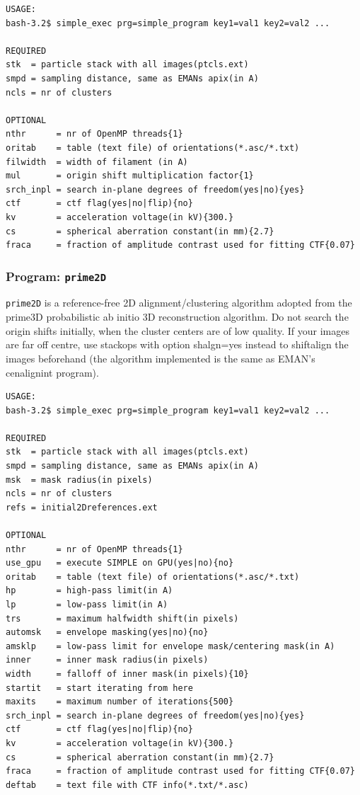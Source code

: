\documentclass[a4paper,11pt]{article}
\newcommand{\prgname}[1]{\textcolor{NavyBlue}{\texttt{#1}}}
\begin{document}
\begin{verbatim}
USAGE:
bash-3.2$ simple_exec prg=simple_program key1=val1 key2=val2 ...

REQUIRED
stk  = particle stack with all images(ptcls.ext)
smpd = sampling distance, same as EMANs apix(in A)
ncls = nr of clusters

OPTIONAL
nthr      = nr of OpenMP threads{1}
oritab    = table (text file) of orientations(*.asc/*.txt)
filwidth  = width of filament (in A)
mul       = origin shift multiplication factor{1}
srch_inpl = search in-plane degrees of freedom(yes|no){yes}
ctf       = ctf flag(yes|no|flip){no}
kv        = acceleration voltage(in kV){300.}
cs        = spherical aberration constant(in mm){2.7}
fraca     = fraction of amplitude contrast used for fitting CTF{0.07}
\end{verbatim}

\subsubsection{Program: \prgname{prime2D}}
\label{prime2D}
\prgname{prime2D} is a reference-free 2D alignment/clustering algorithm adopted from the prime3D probabilistic ab initio 3D reconstruction algorithm. Do not search the origin shifts initially, when the cluster centers are of low quality. If your images are far off centre, use stackops with option shalgn=yes instead to shiftalign the images beforehand (the algorithm implemented is the same as EMAN's cenalignint program).

\begin{verbatim}
USAGE:
bash-3.2$ simple_exec prg=simple_program key1=val1 key2=val2 ...

REQUIRED
stk  = particle stack with all images(ptcls.ext)
smpd = sampling distance, same as EMANs apix(in A)
msk  = mask radius(in pixels)
ncls = nr of clusters
refs = initial2Dreferences.ext

OPTIONAL
nthr      = nr of OpenMP threads{1}
use_gpu   = execute SIMPLE on GPU(yes|no){no}
oritab    = table (text file) of orientations(*.asc/*.txt)
hp        = high-pass limit(in A)
lp        = low-pass limit(in A)
trs       = maximum halfwidth shift(in pixels)
automsk   = envelope masking(yes|no){no}
amsklp    = low-pass limit for envelope mask/centering mask(in A)
inner     = inner mask radius(in pixels)
width     = falloff of inner mask(in pixels){10}
startit   = start iterating from here
maxits    = maximum number of iterations{500}
srch_inpl = search in-plane degrees of freedom(yes|no){yes}
ctf       = ctf flag(yes|no|flip){no}
kv        = acceleration voltage(in kV){300.}
cs        = spherical aberration constant(in mm){2.7}
fraca     = fraction of amplitude contrast used for fitting CTF{0.07}
deftab    = text file with CTF info(*.txt/*.asc)
\end{verbatim}
\end{document}
